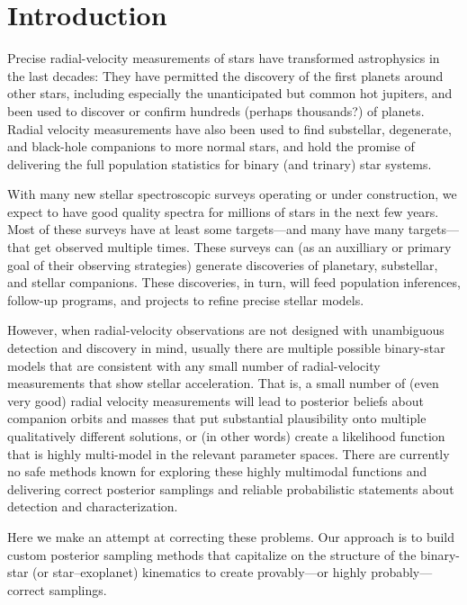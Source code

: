 \documentclass[12pt, preprint]{aastex}
\begin{document}

\section{Introduction}

Precise radial-velocity measurements of stars have transformed
astrophysics in the last decades:
They have permitted the discovery of the first planets around other stars,
including especially the unanticipated but common hot jupiters,
and been used to discover or confirm hundreds
(perhaps thousands?) of planets.
Radial velocity measurements have also been used to find substellar,
degenerate, and black-hole companions to more normal stars, and hold
the promise of delivering the full population statistics for binary
(and trinary) star systems.

With many new stellar spectroscopic surveys operating or under
construction, we expect to have good quality spectra for millions
of stars in the next few years.
Most of these surveys have at least some targets---and many have many
targets---that get observed multiple times.
These surveys can (as an auxilliary or primary goal of their observing
strategies) generate discoveries of planetary, substellar, and stellar
companions.
These discoveries, in turn, will feed population inferences, follow-up
programs, and projects to refine precise stellar models.

However, when radial-velocity observations are not designed with
unambiguous detection and discovery in mind, usually there are
multiple possible binary-star models that are consistent with any
small number of radial-velocity measurements that show stellar
acceleration.
That is, a small number of (even very good) radial velocity
measurements will lead to posterior beliefs about companion orbits and
masses that put substantial plausibility onto multiple qualitatively
different solutions, or (in other words) create a likelihood function
that is highly multi-model in the relevant parameter spaces.
There are currently no safe methods known for exploring these highly
multimodal functions and delivering correct posterior samplings and
reliable probabilistic statements about detection and
characterization.

Here we make an attempt at correcting these problems.
Our approach is to build custom posterior sampling methods that
capitalize on the structure of the binary-star (or star--exoplanet)
kinematics to create provably---or highly probably---correct
samplings.
\end{document}
